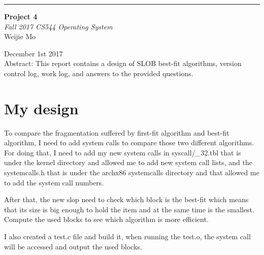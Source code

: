\documentclass[10pt,draftclsnofoot,peerreview,letterpaper,onecolumn,]{IEEEtran}
\begin{document}
\begin{titlepage} %
	
	\raggedleft %
	
	\rule{1pt}{\textheight} %
	\hspace{0.05\textwidth} %
	\parbox[b]{0.75\textwidth}{ %
		
		{\Huge\bfseries Project 4 }\\[2\baselineskip] %
		{\large\textit{Fall 2017 CS544 Operating System}}\\[4\baselineskip] %
		{\Large Weijie Mo} %
		
		\vspace{0.5\textheight} %
		
		{\noindent December 1st 2017}\\[\baselineskip] %
        {\noindent Abstract:
    This report contains a design of SLOB best-fit algorithms, version control log, work log, and answers to the provided questions.}\\[\baselineskip] %
	}

\end{titlepage}

\section{My design}
To compare the fragmentation suffered by first-fit algorithm and best-fit algorithm, I need to add system calls to compare those two different algorithms. For doing that, I need to add my new system calls in syscall\//_32.tbl that is under the kernel directory and allowed me to add new system call lists, and the systemcalls.h that is under the arch\/x86\/ systemcalls directory and that allowed me to add the system call numbers.

After that, the new slop need to check which block is the best-fit which means that its size is big enough to hold the item and at the same time is the smallest. Compute the used blocks to see which algorithm is more efficient.

I also created a test.c file and build it, when running the test.o, the system call will be accessed and output the used blocks.
\end{document}
